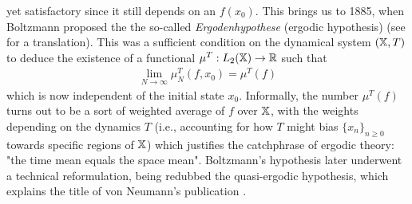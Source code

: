 \documentclass[11pt]{report}
\theoremstyle{definition}
\begin{document}
    yet satisfactory since it still depends on an $f(x_0)$. This brings us to
    1885, when Boltzmann proposed the the so-called \textit{Ergodenhypothese}
    (ergodic hypothesis) \cite{Hasenöhrl_Boltzmann_2012} (see
    \cite{Boltzmann_2019} for a translation). This was a sufficient condition on
    the dynamical system $(\mathbb{X},T)$ to deduce the existence of a functional
    $\mu^T:L_2(\mathbb{X})\rightarrow\mathbb{R}$ such that
    \begin{align}
        \lim_{N\rightarrow\infty}\mu_N^T(f,x_0)=\mu^T(f)\label{eq2}
    \end{align}
    which is now independent of the initial state $x_0$. Informally, the number
    $\mu^T(f)$ turns out to be a sort of weighted average of $f$ over $\mathbb{X}$,
    with the weights depending on the dynamics $T$ (i.e., accounting for how $T$
    might bias $\{x_n\}_{n\geq 0}$ towards specific regions of $\mathbb{X}$) which
    justifies the catchphrase of ergodic theory: "the time mean equals the space
    mean". Boltzmann's hypothesis later underwent a technical reformulation,
    being redubbed the quasi-ergodic hypothesis, which explains the title of von
    Neumann's publication \cite{Neumann_1932}. 
\end{document}
